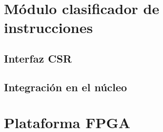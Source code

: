 \section{Módulo clasificador de instrucciones}
\label{sec:clasificador_impl}


\subsection{Interfaz CSR}
\label{sec:csr_impl}


\subsection{Integración en el núcleo}
\label{sec:integracion_impl}


\section{Plataforma FPGA}
\label{sec:plataforma_impl}


